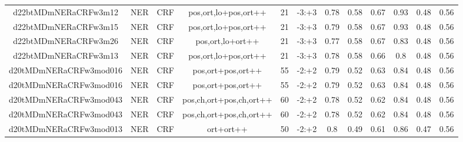 \documentclass[a4paper]{article}
\begin{document}
\begin{landscape}
\begin{center}
\begin{tabular}{ |c|c|c|c|c|c|c|c|c|c|c|c|}
 
 	
 	\small{ d22btMDmNERaCRFw3m12 } & \small{ NER} & \small{  CRF }  & pos,ort,lo+pos,ort++  &  21 &  \small{  -3:+3 }  &  0.78 & 0.58 & 0.67  &  0.93 & 0.48 & 0.56 \\
 	

 
 	
 	\small{ d22btMDmNERaCRFw3m15 } & \small{ NER} & \small{  CRF }  & pos,ort,lo+pos,ort++  &  21 &  \small{  -3:+3 }  &  0.79 & 0.58 & 0.67  &  0.93 & 0.48 & 0.56 \\
 	

 
 	
 	\small{ d22btMDmNERaCRFw3m26 } & \small{ NER} & \small{  CRF }  & pos,ort,lo+ort++  &  21 &  \small{  -3:+3 }  &  0.77 & 0.58 & 0.67  &  0.83 & 0.48 & 0.56 \\
 	

 
 	
 	\small{ d22btMDmNERaCRFw3m13 } & \small{ NER} & \small{  CRF }  & pos,ort,lo+pos,ort++  &  21 &  \small{  -3:+3 }  &  0.78 & 0.58 & 0.66  &  0.8 & 0.48 & 0.56 \\
 	

 
 	
 	\small{ d20tMDmNERaCRFw3mod016 } & \small{ NER} & \small{  CRF }  & pos,ort+pos,ort++  &  55 &  \small{  -2:+2 }  &  0.79 & 0.52 & 0.63  &  0.84 & 0.48 & 0.56 \\
 	

 
 	
 	\small{ d20tMDmNERaCRFw3mod016 } & \small{ NER} & \small{  CRF }  & pos,ort+pos,ort++  &  55 &  \small{  -2:+2 }  &  0.79 & 0.52 & 0.63  &  0.84 & 0.48 & 0.56 \\
 	

 
 	
 	\small{ d20tMDmNERaCRFw3mod043 } & \small{ NER} & \small{  CRF }  & pos,ch,ort+pos,ch,ort++  &  60 &  \small{  -2:+2 }  &  0.78 & 0.52 & 0.62  &  0.84 & 0.48 & 0.56 \\
 	

 
 	
 	\small{ d20tMDmNERaCRFw3mod043 } & \small{ NER} & \small{  CRF }  & pos,ch,ort+pos,ch,ort++  &  60 &  \small{  -2:+2 }  &  0.78 & 0.52 & 0.62  &  0.84 & 0.48 & 0.56 \\
 	

 
 	
 	\small{ d20tMDmNERaCRFw3mod013 } & \small{ NER} & \small{  CRF }  & ort+ort++  &  50 &  \small{  -2:+2 }  &  0.8 & 0.49 & 0.61  &  0.86 & 0.47 & 0.56 \\
 	


\end{tabular}
\end{center}
\end{landscape}
\end{document}
